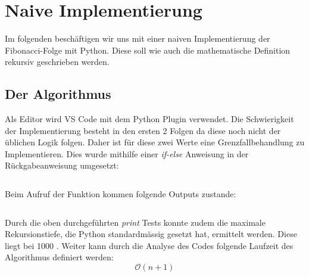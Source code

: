 \section{Naive Implementierung}
Im folgenden beschäftigen wir uns mit einer naiven
Implementierung der Fibonacci-Folge mit Python.
Diese soll wie auch die mathematische Definition rekursiv geschrieben werden.
\subsection{Der Algorithmus}
Als Editor wird VS Code mit dem Python Plugin verwendet.
Die Schwierigkeit der Implementierung besteht in den
ersten 2 Folgen da diese noch nicht der üblichen Logik folgen.
Daher ist für diese zwei Werte eine Grenzfallbehandlung
zu Implementieren. Dies wurde mithilfe einer \textit{if-else}
Anweisung in der Rückgabeanweisung umgesetzt:
\begin{mdframed}[backgroundcolor=bg]
    \inputminted{Python}{src/naive_fibonacci.py}
\end{mdframed}
Beim Aufruf der Funktion kommen folgende Outputs zustande:
\begin{mdframed}[backgroundcolor=bg]
    \inputminted{Python}{src/naive_fibonacci_test.py}
\end{mdframed}
Durch die oben durchgeführten \textit{print} Tests konnte
zudem die maximale Rekursionstiefe, die Python standardmässig
gesetzt hat, ermittelt werden. 
Diese liegt bei 1000 \cite{python_max_rec}. 
Weiter kann durch die Analyse des Codes folgende
Laufzeit des Algorithmus definiert werden:
\begin{equation}
    \mathcal{O}(n + 1)
\end{equation}

